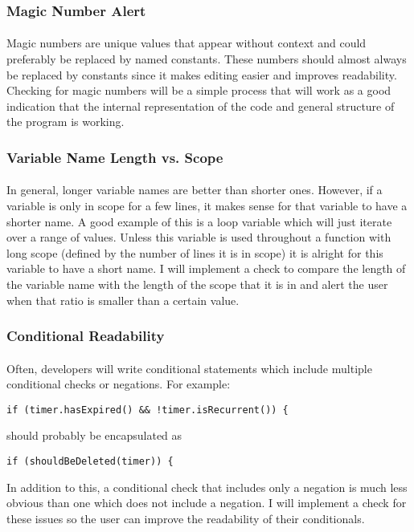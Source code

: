 \documentclass{article}
\begin{document}
\subsubsection{Magic Number Alert}
\paragraph{} 
Magic numbers are unique values that appear without context and could preferably be replaced by named constants. These numbers should almost always be replaced by constants since it makes editing easier and improves readability. Checking for magic numbers will be a simple process that will work as a good indication that the internal representation of the code and general structure of the program is working.

\subsubsection{Variable Name Length vs. Scope}
\paragraph{}
In general, longer variable names are better than shorter ones. However, if a variable is only in scope for a few lines, it makes sense for that variable to have a shorter name. A good example of this is a loop variable which will just iterate over a range of values. Unless this variable is used throughout a function with long scope (defined by the number of lines it is in scope) it is alright for this variable to have a short name. I will implement a check to compare the length of the variable name with the length of the scope that it is in and alert the user when that ratio is smaller than a certain value.

\subsubsection{Conditional Readability}
\paragraph{} 
Often, developers will write conditional statements which include multiple conditional checks or negations. For example:
\begin{verbatim}if (timer.hasExpired() && !timer.isRecurrent()) {
\end{verbatim}
should probably be encapsulated as
\begin{verbatim}
if (shouldBeDeleted(timer)) {
\end{verbatim}
In addition to this, a conditional check that includes only a negation is much less obvious than one which does not include a negation. I will implement a check for these issues so the user can improve the readability of their conditionals.
\end{document}
